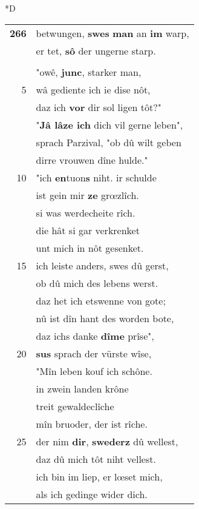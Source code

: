 \documentclass[8pt,a4paper,notitlepage]{article}
\begin{document}
\begin{table}[ht]
\begin{minipage}[t]{0.5\linewidth}
\small
\begin{center}*D
\end{center}
\begin{tabular}{rl}
\textbf{266} & betwungen, \textbf{swes} \textbf{man} an \textbf{im} warp,\\ 
 & er tet, \textbf{sô} der ungerne starp.\\ 
 & \textbf{\begin{large}E\end{large}r} sprach ze Parzivale sân:\\ 
 & "owê, \textbf{junc}, starker man,\\ 
5 & wâ gediente ich ie dise nôt,\\ 
 & daz ich \textbf{vor} dir sol ligen tôt?"\\ 
 & "\textbf{Jâ lâze ich} dich vil gerne leben",\\ 
 & sprach Parzival, "ob dû wilt geben\\ 
 & dirre vrouwen dîne hulde."\\ 
10 & "ich \textbf{en}tuon\textbf{s} niht. ir schulde\\ 
 & ist gein mir \textbf{ze} grœzlîch.\\ 
 & si was werdecheite rîch.\\ 
 & die hât si gar verkrenket\\ 
 & unt mich in nôt gesenket.\\ 
15 & ich leiste anders, swes dû gerst,\\ 
 & ob dû mich des lebens werst.\\ 
 & daz het ich etswenne von gote;\\ 
 & nû ist dîn hant des worden bote,\\ 
 & daz ichs danke \textbf{dîme} prîse",\\ 
20 & \textbf{sus} sprach der vürste wîse,\\ 
 & "Mîn leben kouf ich schône.\\ 
 & in zwein landen krône\\ 
 & treit gewaldeclîche\\ 
 & mîn bruoder, der ist rîche.\\ 
25 & der nim \textbf{dir}, \textbf{swederz} dû wellest,\\ 
 & daz dû mich tôt niht vellest.\\ 
 & ich bin im liep, er lœset mich,\\ 
 & als ich gedinge wider dich.\\ 

\end{tabular}
\end{minipage}
\end{table}
\end{document}
